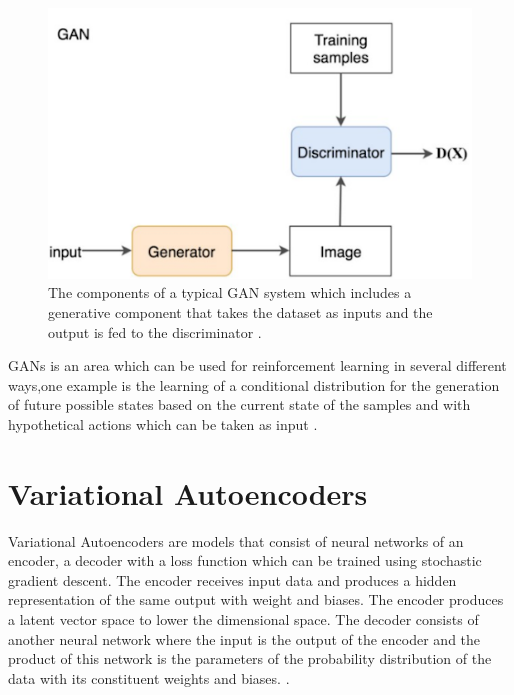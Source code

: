 \begin{figure}
  \centering
  \includegraphics[width=1\linewidth]{graphics/generational_models/GAN.png}
  \caption[Caption for GAN]{The components of a typical GAN system which includes a generative component that takes the dataset as inputs and the output is fed to the discriminator \protect \footnotemark.}
  \label{fig:GAN}
\end{figure}

GANs is an area which can be used  for reinforcement learning in several different ways,one example is the learning of a conditional distribution for the generation of future possible states based on the current state of the samples and with hypothetical actions which can be taken as input \citet{goodfellow:2016}.

\pagebreak
\section{Variational Autoencoders}

Variational Autoencoders  are models that consist of neural networks of an encoder, a decoder with a loss function which can be trained using stochastic gradient descent. The encoder receives input data and produces a hidden representation of the same output with weight and biases. The encoder produces a latent vector space to lower the dimensional space.
The decoder consists of another neural network where the input is the output of the encoder and the product of this network is the parameters of the probability distribution of the data with its constituent weights and biases. \citet{doersch:2016}.

